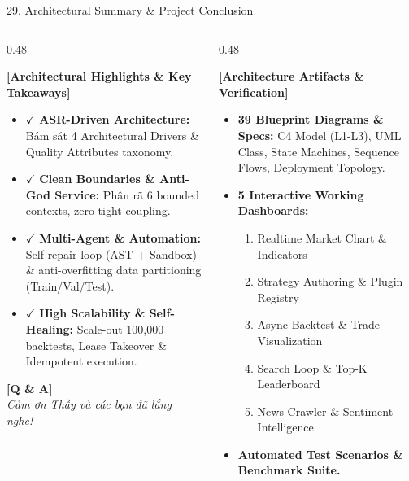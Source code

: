 \documentclass[aspectratio=169,10pt]{beamer}
\begin{document}
\begin{frame}{29. Architectural Summary \& Project Conclusion}
\begin{columns}[T]
\begin{column}{0.48\textwidth}
\begin{block}{\textbf{[Architectural Highlights \& Key Takeaways]}}
\begin{itemize}
  \item $\checkmark$ \textbf{ASR-Driven Architecture:} Bám sát 4 Architectural Drivers \& Quality Attributes taxonomy.
  \item $\checkmark$ \textbf{Clean Boundaries \& Anti-God Service:} Phân rã 6 bounded contexts, zero tight-coupling.
  \item $\checkmark$ \textbf{Multi-Agent \& Automation:} Self-repair loop (AST + Sandbox) \& anti-overfitting data partitioning (Train/Val/Test).
  \item $\checkmark$ \textbf{High Scalability \& Self-Healing:} Scale-out 100,000 backtests, Lease Takeover \& Idempotent execution.
\end{itemize}
\end{block}
\vspace{0.5em}
\centering
\textbf{[Q \& A]} \\
\textit{Cảm ơn Thầy và các bạn đã lắng nghe!}
\end{column}
\begin{column}{0.48\textwidth}
\begin{block}{\textbf{[Architecture Artifacts \& Verification]}}
\begin{itemize}
  \item \textbf{39 Blueprint Diagrams \& Specs:} C4 Model (L1-L3), UML Class, State Machines, Sequence Flows, Deployment Topology.
  \item \textbf{5 Interactive Working Dashboards:}
  \begin{enumerate}
    \item Realtime Market Chart \& Indicators
    \item Strategy Authoring \& Plugin Registry
    \item Async Backtest \& Trade Visualization
    \item Search Loop \& Top-K Leaderboard
    \item News Crawler \& Sentiment Intelligence
  \end{enumerate}
  \item \textbf{Automated Test Scenarios \& Benchmark Suite.}
\end{itemize}
\end{block}
\end{column}
\end{columns}
\end{frame}
\end{document}
